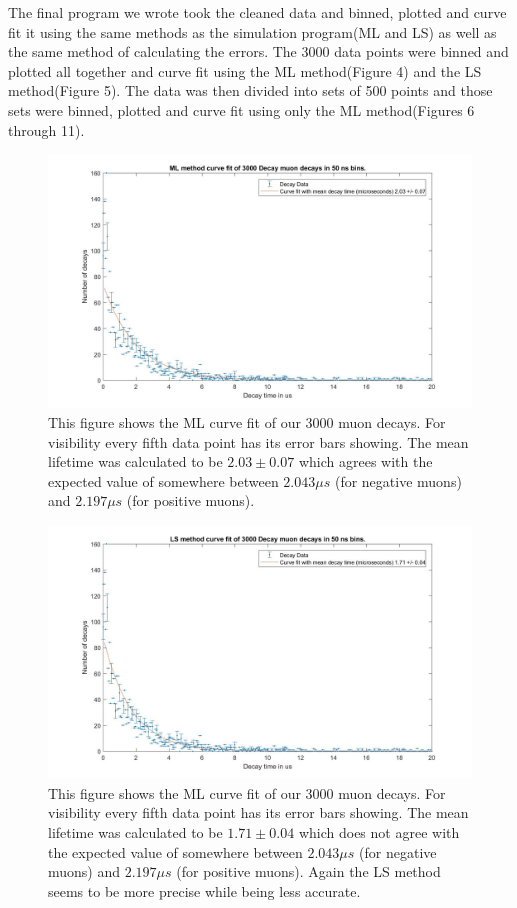 \documentclass{article}
\begin{document}
The final program we wrote took the cleaned data and binned, plotted and curve fit it using the same methods as the simulation program(ML and LS)  as well as the same method of calculating the errors.  The 3000 data points were binned and plotted all together and curve fit using the ML method(Figure 4) and the LS method(Figure 5).  The data was then divided into sets of 500 points and those sets were binned, plotted and curve fit using only the ML method(Figures 6 through 11).

\begin{figure}[H]
\includegraphics[scale=0.4,center]{ML_Curve_Fit_3000.jpg}
\caption{This figure shows the ML curve fit of our 3000 muon decays.  For visibility every fifth data point has its error bars showing.  The mean lifetime was calculated to be $2.03 \pm 0.07$ which agrees with the expected value of somewhere between $2.043 \mu s$ (for negative muons) and $2.197 \mu s$ (for positive muons).}
\end{figure}

\begin{figure}[H]
\includegraphics[scale=0.4,center]{LS_Curve_Fit_3000.jpg}
\caption{This figure shows the ML curve fit of our 3000 muon decays.  For visibility every fifth data point has its error bars showing.  The mean lifetime was calculated to be $1.71 \pm 0.04$ which does not agree with the expected value of somewhere between $2.043 \mu s$ (for negative muons) and $2.197 \mu s$ (for positive muons).  Again the LS method seems to be more precise while being less accurate.}
\end{figure}
 
\end{document}
